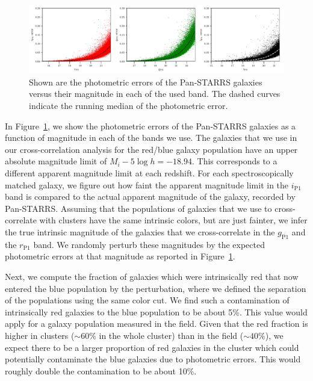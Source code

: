 \documentclass[iop, apjl, twocolappendix, numberedappendix]{emulateapj}
\begin{document}
\begin{figure}
    \includegraphics[width= \textwidth]{mag_errors.pdf}
\caption{Shown are the photometric errors of the Pan-STARRS galaxies versus
their magnitude in each of the used band. The dashed curves indicate the running
median of the photometric error.}
   \label{fig:mag_errors} 
\end{figure}

In Figure~\ref{fig:mag_errors}, we show the photometric errors of the Pan-STARRS
galaxies as a function of magnitude in each of the bands we use. The
galaxies that we use in our cross-correlation analysis for the red/blue
galaxy population have an upper absolute magnitude limit of $M_{i}-5\log h=-18.94$. This
corresponds to a different apparent magnitude limit at each redshift.
For each spectroscopically matched galaxy, we figure out how faint the
apparent magnitude limit in the $i_{\mathrm{P1}}$ band is compared to the actual
apparent magnitude of the galaxy, recorded by Pan-STARRS. Assuming that the populations of
galaxies that we use to cross-correlate with clusters have the same
intrinsic colors, but are just fainter, we infer the true
intrinsic magnitude of the galaxies that we cross-correlate in the
$g_{\mathrm{P1}}$ and the $r_{\mathrm{P1}}$ band. We randomly perturb these magnitudes 
by the expected photometric errors at that magnitude as reported in Figure~\ref{fig:mag_errors}.

Next, we compute the fraction of galaxies which were intrinsically red
that now entered the blue population by the perturbation, where we
defined the separation of the populations using the same color
cut. We find such a contamination of intrinsically red galaxies to
the blue population to be about 5\%. This value would apply for a galaxy population
measured in the field. Given that the red fraction is higher in clusters ($\sim
60$\% in the whole cluster) than in the field ($\sim 40$\%),
we expect there to be a larger proportion of red galaxies in the cluster which could
potentially contaminate the blue galaxies due to photometric errors.
This would roughly double the contamination to be about 10\%.
\end{document}
